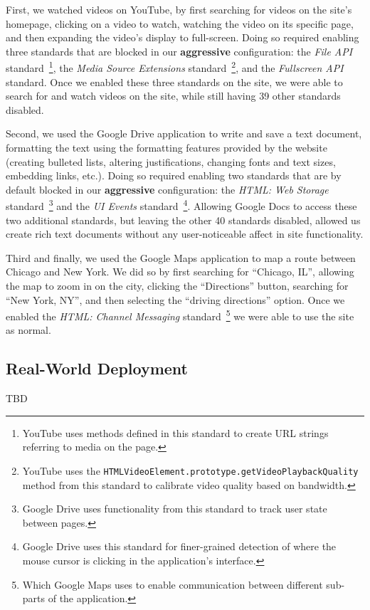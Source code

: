 First, we watched videos on YouTube, by first searching for videos on the
site's homepage, clicking on a video to watch, watching the video on its
specific page, and then expanding the video's display to full-screen.
Doing so required enabling three standards that are blocked in our 
\textbf{aggressive} configuration: the \textit{File API} standard~\footnote{YouTube
uses methods defined in this standard to create URL strings referring to media on the
page.}, the \textit{Media Source Extensions} standard~\footnote{YouTube uses the
\texttt{HTMLVideoElement.prototype.getVideoPlaybackQuality} method from this
standard to calibrate video quality based on bandwidth.}, and the
\textit{Fullscreen API} standard. Once we enabled these three standards on the
site, we were able to search for and watch videos on the site, while still
having 39 other standards disabled.

Second, we used the Google Drive application to write and save a text
document, formatting the text using the formatting features provided by
the website (creating bulleted lists, altering justifications, changing
fonts and text sizes, embedding links, etc.).  Doing so required enabling
two standards that are by default blocked in our \textbf{aggressive} configuration:
the \textit{HTML: Web Storage} standard~\footnote{Google Drive uses functionality
from this standard to track user state between pages.} and the \textit{UI Events}
standard~\footnote{Google Drive uses this standard for finer-grained detection
of where the mouse cursor is clicking in the application's interface.}.
Allowing Google Docs to access these two additional standards, but leaving
the other 40 standards disabled, allowed us create rich text documents without
any user-noticeable affect in site functionality.

Third and finally, we used the Google Maps application to map a route between
Chicago and New York.  We did so by first searching for ``Chicago, IL'',
allowing the map to zoom in on the city, clicking the ``Directions'' button,
searching for ``New York, NY'', and then selecting the ``driving directions''
option.  Once we enabled the \textit{HTML: Channel Messaging}
standard~\footnote{Which Google Maps uses to enable communication between different
sub-parts of the application.} we were able to use the site as normal.

\subsection{Real-World Deployment}
TBD